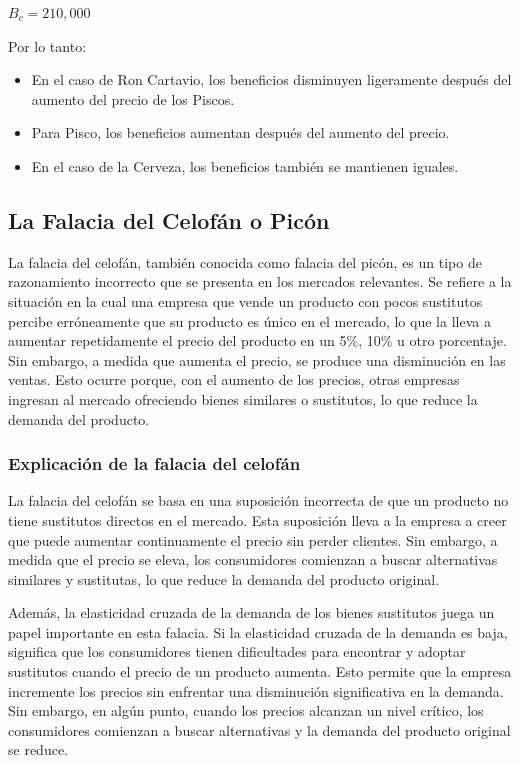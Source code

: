 \documentclass[
  letterpaper,
  DIV=11,
  numbers=noendperiod]{scrartcl}
\providecommand{\tightlist}{%
  \setlength{\itemsep}{0pt}\setlength{\parskip}{0pt}}\usepackage{longtable,booktabs,array}
\begin{document}
\(B_c = 210,000\)

Por lo tanto:

\begin{itemize}
\tightlist
\item
  En el caso de Ron Cartavio, los beneficios disminuyen ligeramente
  después del aumento del precio de los Piscos.
\item
  Para Pisco, los beneficios aumentan después del aumento del precio.
\item
  En el caso de la Cerveza, los beneficios también se mantienen iguales.
\end{itemize}

\hypertarget{la-falacia-del-celofuxe1n-o-picuxf3n}{%
\subsection{La Falacia del Celofán o
Picón}\label{la-falacia-del-celofuxe1n-o-picuxf3n}}

La falacia del celofán, también conocida como falacia del picón, es un
tipo de razonamiento incorrecto que se presenta en los mercados
relevantes. Se refiere a la situación en la cual una empresa que vende
un producto con pocos sustitutos percibe erróneamente que su producto es
único en el mercado, lo que la lleva a aumentar repetidamente el precio
del producto en un 5\%, 10\% u otro porcentaje. Sin embargo, a medida
que aumenta el precio, se produce una disminución en las ventas. Esto
ocurre porque, con el aumento de los precios, otras empresas ingresan al
mercado ofreciendo bienes similares o sustitutos, lo que reduce la
demanda del producto.

\hypertarget{explicaciuxf3n-de-la-falacia-del-celofuxe1n}{%
\subsubsection{Explicación de la falacia del
celofán}\label{explicaciuxf3n-de-la-falacia-del-celofuxe1n}}

La falacia del celofán se basa en una suposición incorrecta de que un
producto no tiene sustitutos directos en el mercado. Esta suposición
lleva a la empresa a creer que puede aumentar continuamente el precio
sin perder clientes. Sin embargo, a medida que el precio se eleva, los
consumidores comienzan a buscar alternativas similares y sustitutas, lo
que reduce la demanda del producto original.

Además, la elasticidad cruzada de la demanda de los bienes sustitutos
juega un papel importante en esta falacia. Si la elasticidad cruzada de
la demanda es baja, significa que los consumidores tienen dificultades
para encontrar y adoptar sustitutos cuando el precio de un producto
aumenta. Esto permite que la empresa incremente los precios sin
enfrentar una disminución significativa en la demanda. Sin embargo, en
algún punto, cuando los precios alcanzan un nivel crítico, los
consumidores comienzan a buscar alternativas y la demanda del producto
original se reduce.
\end{document}
